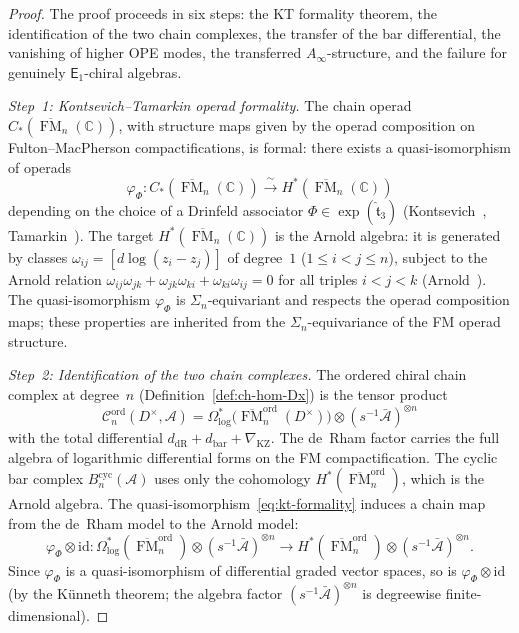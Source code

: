 \documentclass[11pt,reqno]{amsart}
\theoremstyle{definition}
\theoremstyle{remark}
\newcommand{\cA}{\mathcal{A}}
\newcommand{\cC}{\mathcal{C}}
\newcommand{\Ainf}{A_{\infty}}
\newcommand{\Eone}{\mathsf{E}_{1}}
\DeclareMathOperator{\FM}{FM}
\newcommand{\CC}{\mathbb{C}}
\newcommand{\id}{\mathrm{id}}
\numberwithin{equation}{section}
\begin{document}
\begin{proof}
The proof proceeds in six steps: the KT formality
theorem, the identification of the two chain complexes,
the transfer of the bar differential, the vanishing of
higher OPE modes, the transferred $\Ainf$-structure, and
the failure for genuinely $\Eone$-chiral algebras.

\medskip
\noindent\textit{Step~1: Kontsevich--Tamarkin operad formality.}
The chain operad $C_*(\overline{\FM}_n(\CC))$, with
structure maps given by the operad composition on
Fulton--MacPherson compactifications, is formal: there
exists a quasi-isomorphism of operads
\begin{equation}\label{eq:kt-formality}
  \varphi_\Phi \colon
  C_*(\overline{\FM}_n(\CC))
  \xrightarrow{\;\sim\;}
  H^*(\overline{\FM}_n(\CC))
\end{equation}
depending on the choice of a Drinfeld associator
$\Phi \in \exp(\hat{\mathfrak{t}}_3)$
\textup{(}Kontsevich~\cite{Kontsevich99},
Tamarkin~\cite{Tamarkin03}\textup{)}.
The target $H^*(\overline{\FM}_n(\CC))$ is the
Arnold algebra: it is generated by classes
$\omega_{ij} = [d\log(z_i - z_j)]$ of degree~$1$
\textup{(}$1 \leq i < j \leq n$\textup{)},
subject to the Arnold relation
$\omega_{ij}\omega_{jk}
+ \omega_{jk}\omega_{ki}
+ \omega_{ki}\omega_{ij} = 0$
for all triples $i < j < k$
\textup{(}Arnold~\cite{Arnold69}\textup{)}.
The quasi-isomorphism $\varphi_\Phi$ is
$\Sigma_n$-equivariant and respects the operad
composition maps; these properties are inherited from the
$\Sigma_n$-equivariance of the FM operad structure.

\medskip
\noindent\textit{Step~2: Identification of the two
chain complexes.}
The ordered chiral chain complex at degree~$n$
\textup{(}Definition~\textup{\ref{def:ch-hom-Dx}}\textup{)}
is the tensor product
\[
  \cC_n^{\mathrm{ord}}(D^\times, \cA)
  = \Omega^*_{\log}\bigl(
  \overline{\FM}_n^{\mathrm{ord}}(D^\times)\bigr)
  \otimes (s^{-1}\bar{\cA})^{\otimes n}
\]
with the total differential
$d_{\mathrm{dR}} + d_{\mathrm{bar}} + \nabla_{\mathrm{KZ}}$.
The de~Rham factor carries the full algebra of
logarithmic differential forms on the FM compactification.
The cyclic bar complex
$B^{\mathrm{cyc}}_n(\cA)$ uses only the cohomology
$H^*(\overline{\FM}_n^{\mathrm{ord}})$, which is the
Arnold algebra.
The quasi-isomorphism~\eqref{eq:kt-formality} induces a
chain map from the de~Rham model to the Arnold model:
\begin{equation}\label{eq:transfer-cx}
  \varphi_\Phi \otimes \id
  \colon
  \Omega^*_{\log}(\overline{\FM}_n^{\mathrm{ord}})
  \otimes (s^{-1}\bar{\cA})^{\otimes n}
  \longrightarrow
  H^*(\overline{\FM}_n^{\mathrm{ord}})
  \otimes (s^{-1}\bar{\cA})^{\otimes n}.
\end{equation}
Since $\varphi_\Phi$ is a quasi-isomorphism of
differential graded vector spaces, so is
$\varphi_\Phi \otimes \id$
\textup{(}by the K\"unneth theorem; the algebra factor
$(s^{-1}\bar{\cA})^{\otimes n}$ is degreewise
finite-dimensional\textup{)}.


\end{proof}
\end{document}
